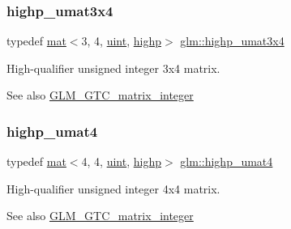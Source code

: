 \subsubsection{\texorpdfstring{highp\+\_\+umat3x4}{highp\_umat3x4}}
{\footnotesize\ttfamily typedef \mbox{\hyperlink{structglm_1_1mat}{mat}}$<$3, 4, \mbox{\hyperlink{group__core__precision_ga4fd29415871152bfb5abd588334147c8}{uint}}, \mbox{\hyperlink{namespaceglm_a36ed105b07c7746804d7fdc7cc90ff25ac6f7eab42eacbb10d59a58e95e362074}{highp}}$>$ \mbox{\hyperlink{group__gtc__matrix__integer_ga6df8a72a571bcd26ade637bf069b5562}{glm\+::highp\+\_\+umat3x4}}}

High-\/qualifier unsigned integer 3x4 matrix. \begin{DoxySeeAlso}{See also}
\mbox{\hyperlink{group__gtc__matrix__integer}{G\+L\+M\+\_\+\+G\+T\+C\+\_\+matrix\+\_\+integer}} 
\end{DoxySeeAlso}
\mbox{\label{group__gtc__matrix__integer_ga9bc7b9ba044449b412119fa68cf11b20}} 
\subsubsection{\texorpdfstring{highp\+\_\+umat4}{highp\_umat4}}
{\footnotesize\ttfamily typedef \mbox{\hyperlink{structglm_1_1mat}{mat}}$<$4, 4, \mbox{\hyperlink{group__core__precision_ga4fd29415871152bfb5abd588334147c8}{uint}}, \mbox{\hyperlink{namespaceglm_a36ed105b07c7746804d7fdc7cc90ff25ac6f7eab42eacbb10d59a58e95e362074}{highp}}$>$ \mbox{\hyperlink{group__gtc__matrix__integer_ga9bc7b9ba044449b412119fa68cf11b20}{glm\+::highp\+\_\+umat4}}}

High-\/qualifier unsigned integer 4x4 matrix. \begin{DoxySeeAlso}{See also}
\mbox{\hyperlink{group__gtc__matrix__integer}{G\+L\+M\+\_\+\+G\+T\+C\+\_\+matrix\+\_\+integer}} 
\end{DoxySeeAlso}
\mbox{\label{group__gtc__matrix__integer_gaf56fa20818ea9c18fd0a4a8bf141a738}} 

